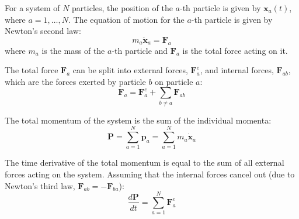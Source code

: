 For a system of $N$ particles, the position of the $a$-th particle is given by $\mathbf{x}_a(t)$, where $a=1, \dots, N$. The equation of motion for the $a$-th particle is given by Newton's second law:
\begin{equation}
    m_a \ddot{\mathbf{x}}_a = \mathbf{F}_a
\end{equation}
where $m_a$ is the mass of the $a$-th particle and $\mathbf{F}_a$ is the total force acting on it.

The total force $\mathbf{F}_a$ can be split into external forces, $\mathbf{F}_a^e$, and internal forces, $\mathbf{F}_{ab}$, which are the forces exerted by particle $b$ on particle $a$:
\begin{equation}
    \mathbf{F}_a = \mathbf{F}_a^e + \sum_{b \neq a} \mathbf{F}_{ab}
\end{equation}

The total momentum of the system is the sum of the individual momenta:
\begin{equation}
    \mathbf{P} = \sum_{a=1}^N \mathbf{p}_a = \sum_{a=1}^N m_a \dot{\mathbf{x}}_a
\end{equation}

The time derivative of the total momentum is equal to the sum of all external forces acting on the system. Assuming that the internal forces cancel out (due to Newton's third law, $\mathbf{F}_{ab} = -\mathbf{F}_{ba}$):
\begin{equation}
    \frac{d\mathbf{P}}{dt} = \sum_{a=1}^N \mathbf{F}_a^e
\end{equation}
